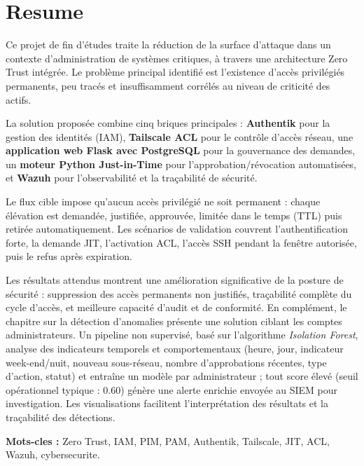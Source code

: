 \chapter*{Resume}

Ce projet de fin d'études traite la réduction de la surface d'attaque dans un contexte d'administration de systèmes critiques, à travers une architecture Zero Trust intégrée. Le problème principal identifié est l'existence d'accès privilégiés permanents, peu tracés et insuffisamment corrélés au niveau de criticité des actifs.

La solution proposée combine cinq briques principales : \textbf{Authentik} pour la gestion des identités (IAM), \textbf{Tailscale ACL} pour le contrôle d'accès réseau, une \textbf{application web Flask avec PostgreSQL} pour la gouvernance des demandes, un \textbf{moteur Python Just-in-Time} pour l'approbation/révocation automatisées, et \textbf{Wazuh} pour l'observabilité et la traçabilité de sécurité.

Le flux cible impose qu'aucun accès privilégié ne soit permanent : chaque élévation est demandée, justifiée, approuvée, limitée dans le temps (TTL) puis retirée automatiquement. Les scénarios de validation couvrent l'authentification forte, la demande JIT, l'activation ACL, l'accès SSH pendant la fenêtre autorisée, puis le refus après expiration.

Les résultats attendus montrent une amélioration significative de la posture de sécurité : suppression des accès permanents non justifiés, traçabilité complète du cycle d'accès, et meilleure capacité d'audit et de conformité.
En complément, le chapitre sur la détection d'anomalies présente une solution ciblant les comptes administrateurs. Un pipeline non supervisé, basé sur l'algorithme \textit{Isolation Forest}, analyse des indicateurs temporels et comportementaux (heure, jour, indicateur week-end/nuit, nouveau sous-réseau, nombre d'approbations récentes, type d'action, statut) et entraîne un modèle par administrateur ; tout score élevé (seuil opérationnel typique : 0.60) génère une alerte enrichie envoyée au SIEM pour investigation. Les visualisations facilitent l'interprétation des résultats et la traçabilité des détections.

\textbf{Mots-cles :} Zero Trust, IAM, PIM, PAM, Authentik, Tailscale, JIT, ACL, Wazuh, cybersecurite.

\clearpage
